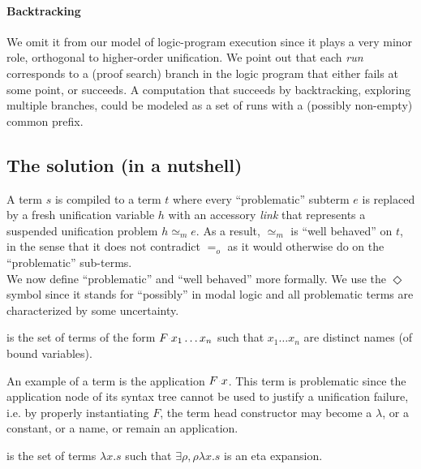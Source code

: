 \documentclass[sigconf,natbib=false,review]{acmart}
\newcommand{\appsep}{\ensuremath{\textcolor{lightgray}{\cdot}}}
\newcommand{\EqualRel}{\ensuremath{=}}
\newcommand{\UnifRel}{\ensuremath{\simeq}}
\newcommand{\Eo}{\ensuremath{\EqualRel_o}\xspace}
\newcommand{\Ue}{\ensuremath{\UnifRel_m}\xspace}
\begin{document}
\paragraph{Backtracking} We omit it from our model of logic-program execution
since it plays a very minor role, orthogonal to higher-order unification.
We point out that each \emph{run} corresponds to a (proof search) branch in the
logic program that either fails at some point, or succeeds. A computation that
succeeds by backtracking, exploring multiple branches, could be
modeled as a set of runs with a (possibly non-empty) common prefix.

\subsection{The solution (in a nutshell)}
\label{sec:nutshell}
A term $s$ is compiled to a term $t$ where every
``problematic'' subterm $e$ is replaced by a fresh unification variable $h$
with an accessory \emph{link} that represents a suspended unification problem
$h \Ue e$. As a result, \Ue is ``well behaved'' on $t$, in the sense that
it does not contradict \Eo as it would otherwise do on the
``problematic'' sub-terms.\\
We now define ``problematic'' and ``well behaved'' more formally.
We use the $\Diamond$ symbol since it stands for ``possibly'' in modal logic
and all problematic terms are characterized by some uncertainty.

\begin{definition}[\maybebeta]\label{def:maybebeta}
  \maybebeta is the set of terms of the form $F \appsep x_1 \ldots x_n$
  such that $x_1 \ldots x_n$ are distinct names (of bound variables).
\end{definition}

\noindent
An example of a \maybebeta{} term is the application $F \appsep x$.
This term is problematic since the application node of 
its syntax tree cannot be used to justify a
unification failure, i.e. by properly instantiating $F$, the term
head constructor may become a $\lambda$, or a constant, or a name, or remain an application.

\begin{definition}[\maybeeta]\label{def:maybeeta}
  \maybeeta is the set of terms $\lambda x.s$ such that $\exists \rho, \rho \lambda x.s$
  is an eta expansion. %
\end{definition}
\end{document}
